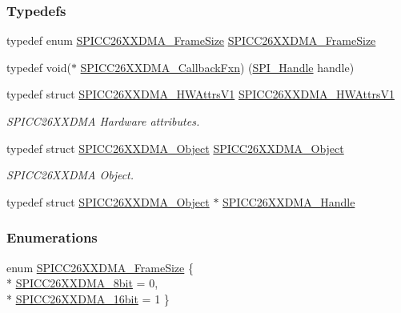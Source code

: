 \subsubsection*{Typedefs}
\begin{DoxyCompactItemize}
\item 
typedef enum \hyperlink{_s_p_i_c_c26_x_x_d_m_a_8h_a1c5afb8465d3e8689a82088ad25fc81a}{S\+P\+I\+C\+C26\+X\+X\+D\+M\+A\+\_\+\+Frame\+Size} \hyperlink{_s_p_i_c_c26_x_x_d_m_a_8h_aa9aa99fc2a0c94cd7aa263ba08eafb92}{S\+P\+I\+C\+C26\+X\+X\+D\+M\+A\+\_\+\+Frame\+Size}
\item 
typedef void($\ast$ \hyperlink{_s_p_i_c_c26_x_x_d_m_a_8h_aee214140ae2ad978d6d755f12a84f331}{S\+P\+I\+C\+C26\+X\+X\+D\+M\+A\+\_\+\+Callback\+Fxn}) (\hyperlink{_s_p_i_8h_a728806534c3c3e8675cfbfb7d8e36f13}{S\+P\+I\+\_\+\+Handle} handle)
\item 
typedef struct \hyperlink{struct_s_p_i_c_c26_x_x_d_m_a___h_w_attrs_v1}{S\+P\+I\+C\+C26\+X\+X\+D\+M\+A\+\_\+\+H\+W\+Attrs\+V1} \hyperlink{_s_p_i_c_c26_x_x_d_m_a_8h_a17117d67b0bd141d91110f2c5bfaa9cf}{S\+P\+I\+C\+C26\+X\+X\+D\+M\+A\+\_\+\+H\+W\+Attrs\+V1}
\begin{DoxyCompactList}\small\item\em S\+P\+I\+C\+C26\+X\+X\+D\+M\+A Hardware attributes. \end{DoxyCompactList}\item 
typedef struct \hyperlink{struct_s_p_i_c_c26_x_x_d_m_a___object}{S\+P\+I\+C\+C26\+X\+X\+D\+M\+A\+\_\+\+Object} \hyperlink{_s_p_i_c_c26_x_x_d_m_a_8h_a17ff5bb4e58bb3bf27c26a711489f5e6}{S\+P\+I\+C\+C26\+X\+X\+D\+M\+A\+\_\+\+Object}
\begin{DoxyCompactList}\small\item\em S\+P\+I\+C\+C26\+X\+X\+D\+M\+A Object. \end{DoxyCompactList}\item 
typedef struct \hyperlink{struct_s_p_i_c_c26_x_x_d_m_a___object}{S\+P\+I\+C\+C26\+X\+X\+D\+M\+A\+\_\+\+Object} $\ast$ \hyperlink{_s_p_i_c_c26_x_x_d_m_a_8h_a23f13f9c52a6ced04e082c64bebf128f}{S\+P\+I\+C\+C26\+X\+X\+D\+M\+A\+\_\+\+Handle}
\end{DoxyCompactItemize}
\subsubsection*{Enumerations}
\begin{DoxyCompactItemize}
\item 
enum \hyperlink{_s_p_i_c_c26_x_x_d_m_a_8h_a1c5afb8465d3e8689a82088ad25fc81a}{S\+P\+I\+C\+C26\+X\+X\+D\+M\+A\+\_\+\+Frame\+Size} \{ \\*
\hyperlink{_s_p_i_c_c26_x_x_d_m_a_8h_a1c5afb8465d3e8689a82088ad25fc81aae775eeccbba1a059e3cf6ada00472a1b}{S\+P\+I\+C\+C26\+X\+X\+D\+M\+A\+\_\+8bit} = 0, 
\\*
\hyperlink{_s_p_i_c_c26_x_x_d_m_a_8h_a1c5afb8465d3e8689a82088ad25fc81aab7e0c593e19cb06ea65ad293f6fd0971}{S\+P\+I\+C\+C26\+X\+X\+D\+M\+A\+\_\+16bit} = 1
 \}
\end{DoxyCompactItemize}
